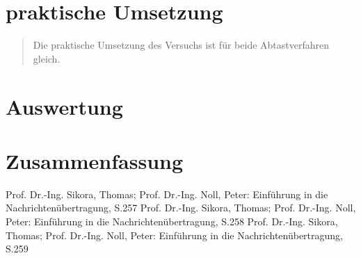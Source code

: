     	    
    
    \section{praktische Umsetzung}
    \begin{quote}
    Die praktische Umsetzung des Versuchs ist für beide Abtastverfahren gleich.
    
    \end{quote}%
    

    
    \section{Auswertung}
    \begin{quote}    
    \end{quote}%
    
    \section{Zusammenfassung}
    \begin{quote}
    \end{quote}%
         




\begin{thebibliography}{999}
  Prof. Dr.-Ing. Sikora, Thomas; Prof. Dr.-Ing. Noll, Peter: Einführung in die
 Nachrichtenübertragung, S.257
 Prof. Dr.-Ing. Sikora, Thomas; Prof. Dr.-Ing. Noll, Peter: Einführung in die
 Nachrichtenübertragung, S.258
 Prof. Dr.-Ing. Sikora, Thomas; Prof. Dr.-Ing. Noll, Peter: Einführung in die
 Nachrichtenübertragung, S.259
 



\end{thebibliography}


